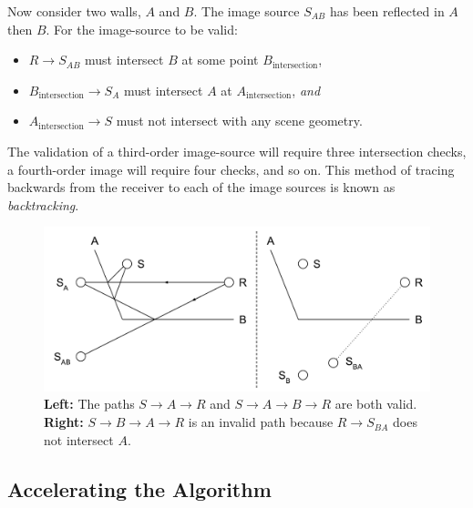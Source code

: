 \documentclass[]{scrreprt}
\providecommand{\tightlist}{%
  \setlength{\itemsep}{0pt}\setlength{\parskip}{0pt}}
\begin{document}
Now consider two walls, \(A\) and \(B\). The image source \(S_{AB}\) has
been reflected in \(A\) then \(B\). For the image-source to be valid:

\begin{itemize}
\tightlist
\item
  \(R \rightarrow S_{AB}\) must intersect \(B\) at some point
  \(B_\text{intersection}\),
\item
  \(B_\text{intersection} \rightarrow S_A\) must intersect \(A\) at
  \(A_\text{intersection}\), \emph{and}
\item
  \(A_\text{intersection} \rightarrow S\) must not intersect with any
  scene geometry.
\end{itemize}

The validation of a third-order image-source will require three
intersection checks, a fourth-order image will require four checks, and
so on. This method of tracing backwards from the receiver to each of the
image sources is known as \emph{backtracking}.

\begin{figure}[htbp]
\centering
\includegraphics{images/backtracking.pdf}
\caption{\textbf{Left:} The paths \(S \rightarrow A \rightarrow R\) and
\(S \rightarrow A \rightarrow B \rightarrow R\) are both valid.
\textbf{Right:} \(S \rightarrow B \rightarrow A \rightarrow R\) is an
invalid path because \(R \rightarrow S_{BA}\) does not intersect
\(A\).\label{fig:backtracking}}
\end{figure}

\subsection{Accelerating the
Algorithm}\label{accelerating-the-algorithm}
\end{document}
